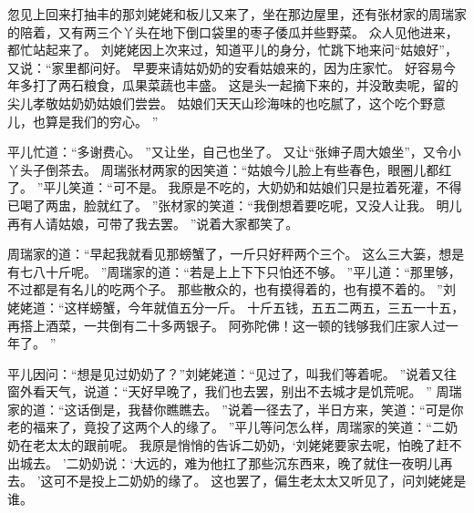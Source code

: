 忽见上回来打抽丰的那刘姥姥和板儿又来了，坐在那边屋里，还有张材家的周瑞家的陪着，又有两三个丫头在地下倒口袋里的枣子倭瓜并些野菜。
众人见他进来，都忙站起来了。
刘姥姥因上次来过，知道平儿的身分，忙跳下地来问“姑娘好”，又说：“家里都问好。
早要来请姑奶奶的安看姑娘来的，因为庄家忙。
好容易今年多打了两石粮食，瓜果菜蔬也丰盛。
这是头一起摘下来的，并没敢卖呢，留的尖儿孝敬姑奶奶姑娘们尝尝。
姑娘们天天山珍海味的也吃腻了，这个吃个野意儿，也算是我们的穷心。
”\par
平儿忙道：“多谢费心。
”又让坐，自己也坐了。
又让“张婶子周大娘坐”，又令小丫头子倒茶去。
周瑞张材两家的因笑道：“姑娘今儿脸上有些春色，眼圈儿都红了。
”平儿笑道：“可不是。
我原是不吃的，大奶奶和姑娘们只是拉着死灌，不得已喝了两盅，脸就红了。
”张材家的笑道：“我倒想着要吃呢，又没人让我。
明儿再有人请姑娘，可带了我去罢。
”说着大家都笑了。
\par
周瑞家的道：“早起我就看见那螃蟹了，一斤只好秤两个三个。
这么三大篓，想是有七八十斤呢。
”周瑞家的道：“若是上上下下只怕还不够。
”平儿道：“那里够，不过都是有名儿的吃两个子。
那些散众的，也有摸得着的，也有摸不着的。
”刘姥姥道：“这样螃蟹，今年就值五分一斤。
十斤五钱，五五二两五，三五一十五，再搭上酒菜，一共倒有二十多两银子。
阿弥陀佛！这一顿的钱够我们庄家人过一年了。
”\par
平儿因问：“想是见过奶奶了？”刘姥姥道：“见过了，叫我们等着呢。
”说着又往窗外看天气，说道：“天好早晚了，我们也去罢，别出不去城才是饥荒呢。
”
周瑞家的道：“这话倒是，我替你瞧瞧去。
”说着一径去了，半日方来，笑道：“可是你老的福来了，竟投了这两个人的缘了。
”平儿等问怎么样，周瑞家的笑道：“二奶奶在老太太的跟前呢。
我原是悄悄的告诉二奶奶，‘刘姥姥要家去呢，怕晚了赶不出城去。
’二奶奶说：‘大远的，难为他扛了那些沉东西来，晚了就住一夜明儿再去。
’这可不是投上二奶奶的缘了。
这也罢了，偏生老太太又听见了，问刘姥姥是谁。
